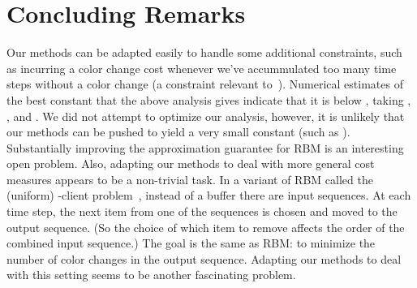 \documentclass[11pt]{article}
\begin{document}
\section{Concluding Remarks}

Our methods can be adapted easily to handle some
additional constraints, such as incurring a color
change cost whenever we've accummulated too
many time steps without a color change (a constraint
relevant to~\cite{ROADEF2005}).
Numerical estimates of the best constant that the above
analysis gives indicate that it is below , taking
, ,
and . We did not
attempt to optimize our analysis, however, it is unlikely
that our methods can be pushed to yield a very small constant
(such as ). Substantially improving the approximation
guarantee for RBM is an interesting open problem. Also,
adapting our methods to deal with more general cost measures
appears to be a non-trivial task. In a variant of RBM called the
(uniform) -client problem~\cite{ATUW01}, instead of a buffer
there are  input sequences. At each time step, the next item
from one of the sequences is chosen and moved to the output
sequence. (So the choice of which item to remove affects the order
of the combined input sequence.) The goal is the same as RBM: to
minimize the number of color changes in the output sequence.
Adapting our methods to deal with this setting seems to be another
fascinating problem.

\newpage
\end{document}
